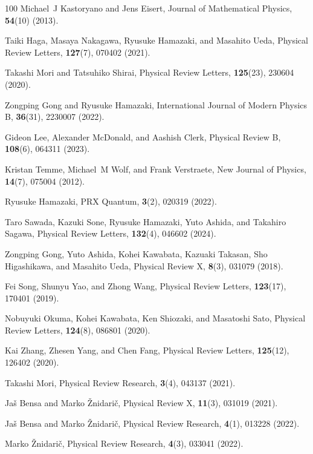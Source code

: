 \documentclass[preprint,pteplogo]{ptephy_v2}%
\numberwithin{equation}{section}
\theoremstyle{definition}
\begin{document}
\begin{thebibliography}{100}
Michael~J Kastoryano and Jens Eisert, Journal of Mathematical Physics, {\bf 54}(10) (2013).

Taiki Haga, Masaya Nakagawa, Ryusuke Hamazaki, and Masahito Ueda, Physical Review Letters, {\bf 127}(7), 070402 (2021).

Takashi Mori and Tatsuhiko Shirai, Physical Review Letters, {\bf 125}(23), 230604 (2020).

Zongping Gong and Ryusuke Hamazaki, International Journal of Modern Physics B, {\bf 36}(31), 2230007 (2022).

Gideon Lee, Alexander McDonald, and Aashish Clerk, Physical Review B, {\bf 108}(6), 064311 (2023).

Kristan Temme, Michael~M Wolf, and Frank Verstraete, New Journal of Physics, {\bf 14}(7), 075004 (2012).

Ryusuke Hamazaki, PRX Quantum, {\bf 3}(2), 020319 (2022).

Taro Sawada, Kazuki Sone, Ryusuke Hamazaki, Yuto Ashida, and Takahiro Sagawa, Physical Review Letters, {\bf 132}(4), 046602 (2024).

Zongping Gong, Yuto Ashida, Kohei Kawabata, Kazuaki Takasan, Sho Higashikawa, and Masahito Ueda, Physical Review X, {\bf 8}(3), 031079 (2018).

Fei Song, Shunyu Yao, and Zhong Wang, Physical Review Letters, {\bf 123}(17), 170401 (2019).

Nobuyuki Okuma, Kohei Kawabata, Ken Shiozaki, and Masatoshi Sato, Physical Review Letters, {\bf 124}(8), 086801 (2020).

Kai Zhang, Zhesen Yang, and Chen Fang, Physical Review Letters, {\bf 125}(12), 126402 (2020).

Takashi Mori, Physical Review Research, {\bf 3}(4), 043137 (2021).

Ja{\v{s}} Bensa and Marko {\v{Z}}nidari{\v{c}}, Physical Review X, {\bf 11}(3), 031019 (2021).

Ja{\v{s}} Bensa and Marko {\v{Z}}nidari{\v{c}}, Physical Review Research, {\bf 4}(1), 013228 (2022).

Marko {\v{Z}}nidari{\v{c}}, Physical Review Research, {\bf 4}(3), 033041 (2022).


\end{thebibliography}
\end{document}
